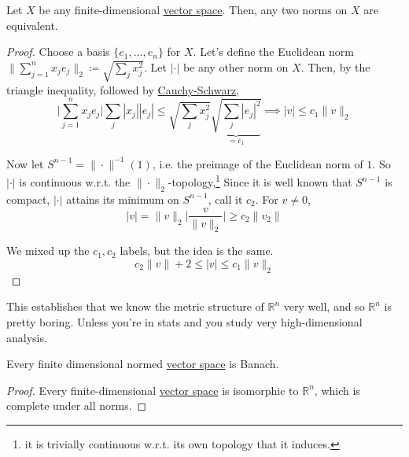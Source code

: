   \begin{theorem}
    \label{thm:all-norms-on-a-finite-dimensional-space-are}
    Let $X$ be any finite-dimensional \hyperref[lin-def:vector-space]{vector space}. Then, any two norms on $X$ are equivalent. 
  \end{theorem}
  \begin{proof}
    Choose a basis $\{e_1, \ldots, e_n\}$ for $X$. Let's define the Euclidean norm $\| \sum_{j=1}^n x_j e_j\|_2 \coloneqq \sqrt{\sum_j x_j^2}$. Let $|\cdot|$ be any other norm on $X$. Then, by the triangle inequality, followed by \hyperref[lin-thm:cauchy-schwarz-inequality]{Cauchy-Schwarz}, 
    \begin{equation}
      \bigg| \sum_{j=1}^n x_j e_j \bigg| \sum_j |x_j| |e_j|  \leq \sqrt{\sum_j x_j^2} \underbrace{\sqrt{\sum_j |e_j|^2}}_{= c_1} \implies |v| \leq c_1 \|v\|_2
    \end{equation}

    Now let $S^{n-1} = \|\cdot\|^{-1} (1)$, i.e. the preimage of the Euclidean norm of $1$. So $| \cdot |$ is continuous w.r.t. the $\|\cdot\|_2$-topology,\footnote{it is trivially continuous w.r.t. its own topology that it induces.} Since it is well known that $S^{n-1}$ is compact, $|\cdot|$ attains its minimum on $S^{n-1}$, call it $c_2$. For $v \neq 0$, 
    \begin{equation}
      |v| = \|v\|_2 \bigg| \frac{v}{\|v\|_2} \bigg| \geq c_2 \|v_2\|
    \end{equation}

    We mixed up the $c_1, c_2$ labels, but the idea is the same. 
    \begin{equation}
      c_2 \|v\|+2 \leq |v| \leq c_1 \|v\|_2 
    \end{equation}
  \end{proof}

  This establishes that we know the metric structure of $\mathbb{R}^n$ very well, and so $\mathbb{R}^n$ is pretty boring. Unless you're in stats and you study very high-dimensional analysis. 

  \begin{corollary}[1.2.6]
    \label{thm:1-2-6}
    Every finite dimensional normed \hyperref[lin-def:vector-space]{vector space} is Banach. 
  \end{corollary}
  \begin{proof}
    Every finite-dimensional \hyperref[lin-def:vector-space]{vector space} is isomorphic to $\mathbb{R}^n$, which is complete under all norms. 
  \end{proof}

